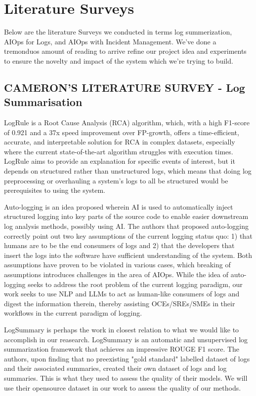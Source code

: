 \documentclass[conference]{IEEEtran}
\begin{document}
\section{Literature Surveys}
Below are the literature Surveys we conducted in terms log summerization, AIOps for Logs, and AIOps with Incident Management. We've done a tremonduos amount of reading to arrive refine our project idea and experiments to ensure the novelty and impact of the system which we're trying to build.

\subsection{CAMERON'S LITERATURE SURVEY - Log Summarisation}

LogRule \cite{logrule} is a Root Cause Analysis (RCA) algorithm, which, with a high F1-score of 0.921 and a 37x speed improvement over FP-growth, offers a time-efficient, accurate, and interpretable solution for RCA in complex datasets, especially where the current state-of-the-art algorithm struggles with execution times. LogRule aims to provide an explanation for specific events of interest, but it depends on structured rather than unstructured logs, which means that doing log preprocessing or overhauling a system's logs to all be structured would be prerequisites to using the system.

Auto-logging \cite{10173904} is an idea proposed wherein AI is used to automatically inject structured logging into key parts of the source code to enable easier downstream log analysis methods, possibly using AI. The authors that proposed auto-logging correctly point out two key assumptions of the current logging status quo: 1) that humans are to be the end consumers of logs and 2) that the developers that insert the logs into the software have sufficient understanding of the system. Both assumptions have proven to be violated in various cases, which breaking of assumptions introduces challenges in the area of AIOps. While the idea of auto-logging seeks to address the root problem of the current logging paradigm, our work seeks to use NLP and LLMs to act as human-like consumers of logs and digest the information therein, thereby assisting OCEs/SREs/SMEs in their workflows in the current paradigm of logging.

LogSummary \cite{10017337} is perhaps the work in closest relation to what we would like to accomplish in our reasearch. LogSummary is an automatic and unsupervised log summarization framework that achieves an impressive ROUGE F1 score. The authors, upon finding that no preexisting "gold standard" labelled dataset of logs and their associated summaries, created their own dataset of logs and log summaries. This is what they used to assess the quality of their models. We will use their opensource dataset in our work to assess the quality of our methods.
\end{document}
